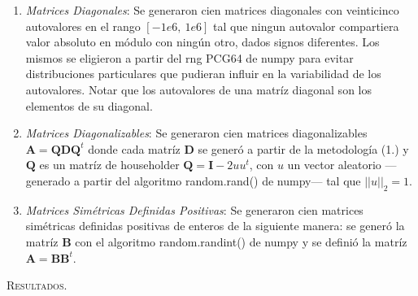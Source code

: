 \vspace{1em}
\begin{enumerate}
    \item \textit{Matrices Diagonales}: Se generaron cien matrices diagonales con veinticinco autovalores en el rango $[-1e6,\ 1e6]$ tal que ningun autovalor compartiera valor absoluto en módulo con ningún otro, dados signos diferentes. Los mismos se eligieron a partir del rng PCG64 de numpy para evitar distribuciones particulares que pudieran influir en la variabilidad de los autovalores. Notar que los autovalores de una matríz diagonal son los elementos de su diagonal. \\
    \item \textit{Matrices Diagonalizables}: Se generaron cien matrices diagonalizables $\mathbf{A} = \mathbf{Q}\mathbf{D}\mathbf{Q}^t$ donde cada matríz $\mathbf{D}$ se generó a partir de la metodología (1.) y $\mathbf{Q}$ es un matríz de householder $\mathbf{Q} = \mathbf{I} - 2uu^t$, con $u$ un vector aleatorio ---generado a partir del algoritmo random.rand() de numpy--- tal que $||u||_2 = 1$. \\
    \item \textit{Matrices Simétricas Definidas Positivas}: Se generaron cien matrices simétricas definidas positivas de enteros de la siguiente manera: se generó la matríz $\mathbf{B}$ con el algoritmo random.randint() de numpy y se definió la matríz $\mathbf{A} = \mathbf{B} \mathbf{B}^t$. 
\end{enumerate}


\vspace{1em}
\noindent \textsc{Resultados}. 

